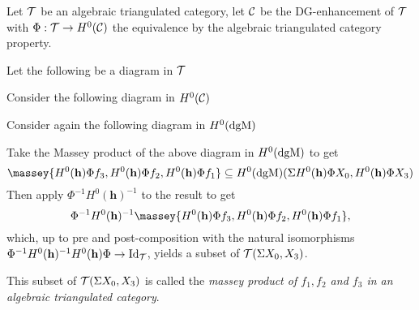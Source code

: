 \begin{definition}
    \label{def:massey_product_alg_tri_cat}
    Let \( {\mathcal{T}} \) be an algebraic triangulated category, let \( {\mathcal{C}} \) be the DG-enhancement of \( {\mathcal{T}} \) with \( \Phi: {\mathcal{T}} \to H^0({\mathcal{C}}) \) the equivalence by the algebraic triangulated category property.
    
    Let the following be a diagram in \( {\mathcal{T}} \)
    \begin{center}
    \end{center}
    Consider the following diagram in \( H^0({\mathcal{C}}) \)
    \begin{center}
    \end{center}
    Consider again the following diagram in \( H^0(\operatorname{dgM}) \)
    \begin{center}
    \end{center}
    Take the Massey product of the above diagram in \( H^0(\operatorname{dgM}) \) to get
    \[
        \massey{H^0(\mathbf{h}) \Phi f_3, H^0(\mathbf{h}) \Phi f_2, H^0(\mathbf{h}) \Phi f_1} \subseteq H^0(\dgM)(\Sigma H^0(\mathbf{h}) \Phi X_0, H^0(\mathbf{h}) \Phi X_3)
    \]
    Then apply \( \Phi^{-1} H^0(\mathbf{h})^{-1} \) to the result to get
    \[
        \Phi^{-1} H^0(\mathbf{h})^{-1} \massey{H^0(\mathbf{h}) \Phi f_3, H^0(\mathbf{h}) \Phi f_2, H^0(\mathbf{h}) \Phi f_1},
    \]
    which, up to pre and post-composition with the natural isomorphisms \( \Phi^{-1} H^0(\mathbf{h})^{-1} H^0(\mathbf{h}) \Phi \to \operatorname{Id}_{{\mathcal{T}}} \), yields a subset of \( {\mathcal{T}}(\Sigma X_0, X_3) \).

    This subset of \( {\mathcal{T}}(\Sigma X_0, X_3) \) is called the \emph{massey product of \( f_1, f_2 \) and \( f_3 \) in an algebraic triangulated category}.
\end{definition}
